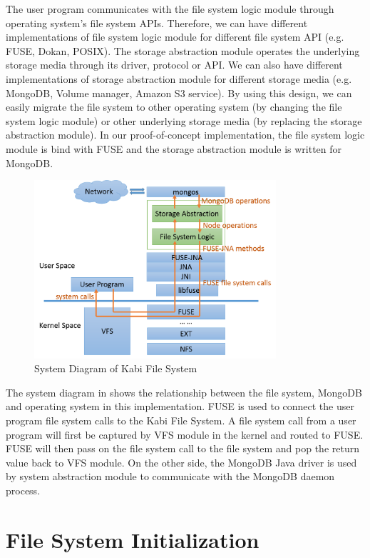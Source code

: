     The user program communicates with the file system logic module through operating system's file system APIs. Therefore, we can have different implementations of file system logic module for different file system API (e.g. FUSE, Dokan, POSIX). The storage abstraction module operates the underlying storage media through its driver, protocol or API. We can also have different implementations of storage abstraction module for different storage media (e.g. MongoDB, Volume manager, Amazon S3 service). By using this design, we can easily migrate the file system to other operating system (by changing the file system logic module) or other underlying storage media (by replacing the storage abstraction module). In our proof-of-concept implementation, the file system logic module is bind with FUSE and the storage abstraction module is written for MongoDB. 

\begin{figure}[t]
\centering
\includegraphics[width=0.8\textwidth]{Chapter-3/figs/fig1.png}
\caption{System Diagram of Kabi File System}
\label{fig:diagram}
\end{figure}

    The system diagram in  shows the relationship between the file system, MongoDB and operating system in this implementation. FUSE is used to connect the user program file system calls to the Kabi File System. A file system call from a user program will first be captured by VFS module in the kernel and routed to FUSE. FUSE will then pass on the file system call to the file system and pop the return value back to VFS module. On the other side, the MongoDB Java driver is used by system abstraction module to communicate with the MongoDB daemon process.

\section{File System Initialization}


